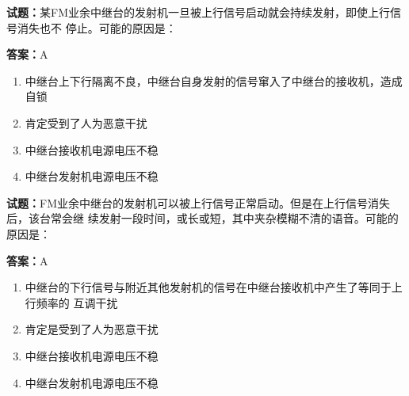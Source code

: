 \documentclass{ctexbook}
\begin{document}




\vspace{1em}

\textbf{试题：}某FM业余中继台的发射机一旦被上行信号启动就会持续发射，即使上行信号消失也不
停止。可能的原因是： 

\textbf{答案：}A 

\begin{enumerate}[leftmargin=3em]
  \item 中继台上下行隔离不良，中继台自身发射的信号窜入了中继台的接收机，造成自锁 

  \item 肯定受到了人为恶意干扰 

  \item 中继台接收机电源电压不稳 

  \item 中继台发射机电源电压不稳 

\end{enumerate}





\vspace{1em}

\textbf{试题：}FM业余中继台的发射机可以被上行信号正常启动。但是在上行信号消失后，该台常会继
续发射一段时间，或长或短，其中夹杂模糊不清的语音。可能的原因是： 

\textbf{答案：}A 

\begin{enumerate}[leftmargin=3em]
  \item 中继台的下行信号与附近其他发射机的信号在中继台接收机中产生了等同于上行频率的
互调干扰 

  \item 肯定是受到了人为恶意干扰 

  \item 中继台接收机电源电压不稳 

  \item 中继台发射机电源电压不稳 

\end{enumerate}





\vspace{1em}
\end{document}
